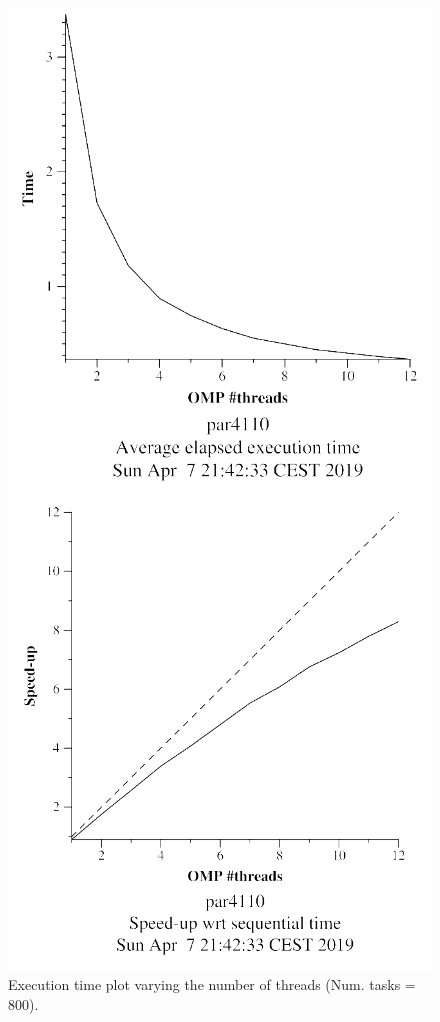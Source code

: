 \documentclass[12pt, a4paper]{article}
\begin{document}
\begin{figure}[H]
\centering
\begin{minipage}[b]{0.4\linewidth}
  \centering
  \includegraphics[scale=0.5]{./mandel-omp-10000-strong-omp-24-800-time}
  \caption{Execution time plot varying the number of threads (Num. tasks = 800).}
  \label{fig:mandel-omp-10000-strong-omp-24-800-time}
\end{minipage}%
\hspace{0.5cm}
\begin{minipage}[b]{0.4\linewidth}
  \centering
  \includegraphics[scale=0.5]{./mandel-omp-10000-strong-omp-24-800-speedup}

\end{minipage}
\end{figure}
\end{document}
